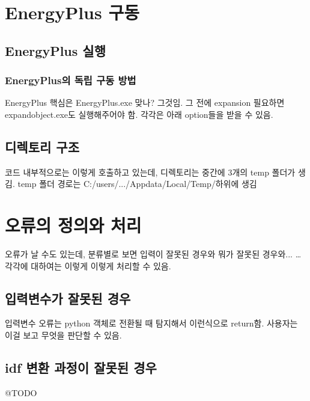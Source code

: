 
\section{EnergyPlus 구동}
\subsection{EnergyPlus 실행}
\subsubsection{EnergyPlus의 독립 구동 방법}
EnergyPlus 핵심은 EnergyPlus.exe 맞나? 그것임.
그 전에 expansion 필요하면 expandobject.exe도 실행해주어야 함.
각각은 아래 option들을 받을 수 있음.

\subsection{디렉토리 구조}
코드 내부적으로는 이렇게 호출하고 있는데,
디렉토리는 중간에 3개의 temp 폴더가 생김.
temp 폴더 경로는 C:/users/.../Appdata/Local/Temp/하위에 생김


\section{오류의 정의와 처리}
오류가 날 수도 있는데, 분류별로 보면 입력이 잘못된 경우와 뭐가 잘못된 경우와... \dots
각각에 대하여는 이렇게 이렇게 처리할 수 있음.

\subsection{입력변수가 잘못된 경우}
입력변수 오류는 python 객체로 전환될 때 탐지해서 이런식으로 return함. 사용자는 이걸 보고 무엇을 판단할 수 있음.

\subsection{idf 변환 과정이 잘못된 경우}
@TODO

